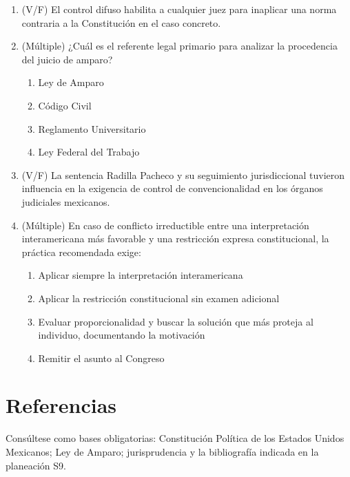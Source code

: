 \documentclass[
  spanish,
  letterpaper, oneside
]{article}
\begin{document}
\begin{enumerate}
\begin{enumerate}[label=\Alph*.]
      \item Ignorar la jurisprudencia interamericana si México no fue parte
      \item Sustituir la Constitución por la interpretación interamericana
    \end{enumerate}
  \item (V/F) El control difuso habilita a cualquier juez para inaplicar una norma contraria a la Constitución en el caso concreto.
  \item (Múltiple) ¿Cuál es el referente legal primario para analizar la procedencia del juicio de amparo?
    \begin{enumerate}[label=\Alph*.]
      \item Ley de Amparo
      \item Código Civil
      \item Reglamento Universitario
      \item Ley Federal del Trabajo
    \end{enumerate}
  \item (V/F) La sentencia Radilla Pacheco y su seguimiento jurisdiccional tuvieron influencia en la exigencia de control de convencionalidad en los órganos judiciales mexicanos.
  \item (Múltiple) En caso de conflicto irreductible entre una interpretación interamericana más favorable y una restricción expresa constitucional, la práctica recomendada exige:
    \begin{enumerate}[label=\Alph*.]
      \item Aplicar siempre la interpretación interamericana
      \item Aplicar la restricción constitucional sin examen adicional
      \item Evaluar proporcionalidad y buscar la solución que más proteja al individuo, documentando la motivación
      \item Remitir el asunto al Congreso
    \end{enumerate}
\end{enumerate}

\clearpage
\section*{Referencias}
Consúltese como bases obligatorias: Constitución Política de los Estados Unidos Mexicanos; Ley de Amparo; jurisprudencia y la bibliografía indicada en la planeación S9.

\templateIndex
\templateFinalcfg
\nocite{cpeum2026,leyAmparo2026,cidhCasoRadillaPacheco2009,scjnAmparoDirecto2021}

\end{document}
